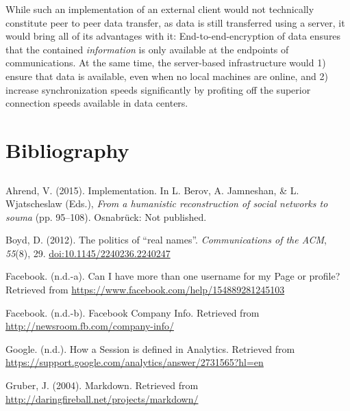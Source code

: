 While such an implementation of an external client would not technically
constitute peer to peer data transfer, as data is still transferred
using a server, it would bring all of its advantages with it:
End-to-end-encryption of data ensures that the contained
\emph{information} is only available at the endpoints of communications.
At the same time, the server-based infrastructure would 1) ensure that
data is available, even when no local machines are online, and 2)
increase synchronization speeds significantly by profiting off the
superior connection speeds available in data centers.

\part*{Bibliography} \manualmark
\markboth{\spacedlowsmallcaps{\bibname}}{\spacedlowsmallcaps{\bibname}}

\chapter*{\bibname}

Ahrend, V. (2015). Implementation. In L. Berov, A. Jamneshan, \& L.
Wjatscheslaw (Eds.), \emph{From a humanistic reconstruction of social
networks to souma} (pp. 95--108). Osnabrück: Not published.

Boyd, D. (2012). The politics of ``real names''. \emph{Communications of
the ACM}, \emph{55}(8), 29.
\href{http://doi.org/10.1145/2240236.2240247}{doi:10.1145/2240236.2240247}

Facebook. (n.d.-a). Can I have more than one username for my Page or
profile? Retrieved from
\url{https://www.facebook.com/help/154889281245103}

Facebook. (n.d.-b). Facebook Company Info. Retrieved from
\url{http://newsroom.fb.com/company-info/}

Google. (n.d.). How a Session is defined in Analytics. Retrieved from
\url{https://support.google.com/analytics/answer/2731565?hl=en}

Gruber, J. (2004). Markdown. Retrieved from
\url{http://daringfireball.net/projects/markdown/}


